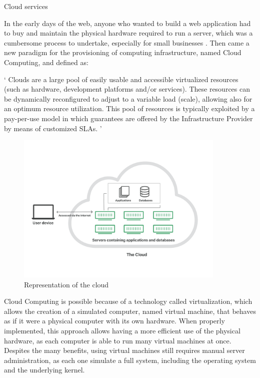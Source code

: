 \begin{chapter}{Cloud services}
    \label{chap:cloud_services}

    In the early days of the web, anyone who wanted to build a web application had
    to buy and maintain the physical hardware required to run a server, which was
    a cumbersome process to undertake, especially for small businesses
    \cite{what_is_sls_cloudflare}.
    Then came a new paradigm for the provisioning of computing infrastructure, named
    Cloud Computing, and defined as:

    \enquote*{%
        Clouds are a large pool of easily usable and accessible virtualized resources
        (such as hardware, development platforms and/or services). These resources
        can be dynamically reconﬁgured to adjust to a variable load (scale), allowing
        also for an optimum resource utilization. This pool of resources is typically
        exploited by a pay-per-use model in which guarantees are offered by the
        Infrastructure Provider by means of customized SLAs.%
    } \cite{cloud_computing_definition}

    \begin{figure}
        \centering
        \includegraphics[width=10cm]{source/images/what-is-the-cloud.png}
        \caption{Representation of the cloud}
    \end{figure}

    Cloud Computing is possible because of a technology called virtualization, which
    allows the creation of a simulated computer, named virtual machine, that behaves
    as if it were a physical computer with its own hardware. When properly implemented,
    this approach allows having a more efficient use of the physical hardware, as
    each computer is able to run many virtual machines at once.
    Despites the many benefits, using virtual machines still requires manual server
    administration, as each one simulate a full system, including the operating
    system and the underlying kernel.


\end{chapter}
